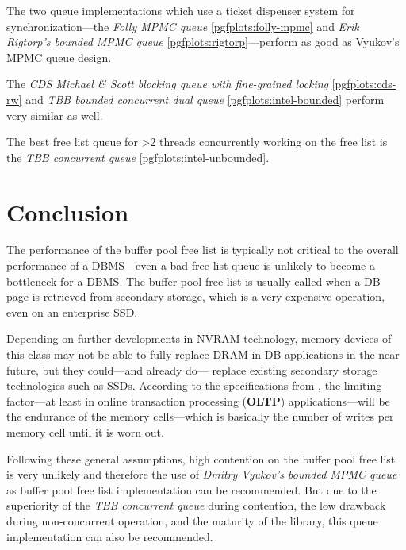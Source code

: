 \begin{@empty}
    The two queue implementations which use a ticket dispenser system for synchronization---the \emph{Folly MPMC queue} \ref{pgfplots:folly-mpmc} and \emph{Erik Rigtorp's bounded MPMC queue} \ref{pgfplots:rigtorp}---perform as good as Vyukov's MPMC queue design.

    The \emph{CDS Michael \& Scott blocking queue with fine-grained locking} \ref{pgfplots:cds-rw} and \emph{TBB bounded concurrent dual queue} \ref{pgfplots:intel-bounded} perform very similar as well.

    The best free list queue for \num{>2} threads concurrently working on the free list is the \emph{TBB concurrent queue} \ref{pgfplots:intel-unbounded}.
\end{@empty}

\section{Conclusion}

    The performance of the buffer pool free list is typically not critical to the overall performance of a DBMS---even a bad free list queue is unlikely to become a bottleneck for a DBMS. The buffer pool free list is usually called when a DB page is retrieved from secondary storage, which is a very expensive operation, even on an enterprise SSD.

    Depending on further developments in NVRAM technology, memory devices of this class may not be able to fully replace DRAM in DB applications in the near future, but they could---and already do--- replace existing secondary storage technologies such as SSDs. According to the specifications from \cite{Arulraj:2015}, the limiting factor---at least in online transaction processing (\textbf{OLTP}) applications---will be the endurance of the memory cells---which is basically the number of writes per memory cell until it is worn out.

    Following these general assumptions, high contention on the buffer pool free list is very unlikely and therefore the use of \emph{Dmitry Vyukov's bounded MPMC queue} as buffer pool free list implementation can be recommended. But due to the superiority of the \emph{TBB concurrent queue} during contention, the low drawback during non-concurrent operation, and the maturity of the library, this queue implementation can also be recommended.
